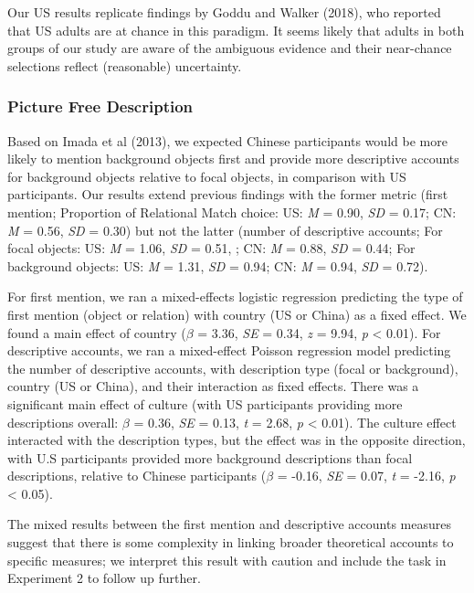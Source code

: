 \documentclass[
  man,floatsintext]{apa6}
\begin{document}
Our US results replicate findings by Goddu and Walker (2018), who reported that US adults are at chance in this paradigm. It seems likely that adults in both groups of our study are aware of the ambiguous evidence and their near-chance selections reflect (reasonable) uncertainty.

\hypertarget{picture-free-description}{%
\subsubsection{Picture Free Description}\label{picture-free-description}}

Based on Imada et al (2013), we expected Chinese participants would be more likely to mention background objects first and provide more descriptive accounts for background objects relative to focal objects, in comparison with US participants. Our results extend previous findings with the former metric (first mention; Proportion of Relational Match choice: US: \emph{M} = 0.90, \emph{SD} = 0.17; CN: \emph{M} = 0.56, \emph{SD} = 0.30) but not the latter (number of descriptive accounts; For focal objects: US: \emph{M} = 1.06, \emph{SD} = 0.51, ; CN: \emph{M} = 0.88, \emph{SD} = 0.44; For background objects: US: \emph{M} = 1.31, \emph{SD} = 0.94; CN: \emph{M} = 0.94, \emph{SD} = 0.72).

For first mention, we ran a mixed-effects logistic regression predicting the type of first mention (object or relation) with country (US or China) as a fixed effect. We found a main effect of country (\(\beta\) = 3.36, \emph{SE} = 0.34, \emph{z} = 9.94, \emph{p} \textless{} 0.01). For descriptive accounts, we ran a mixed-effect Poisson regression model predicting the number of descriptive accounts, with description type (focal or background), country (US or China), and their interaction as fixed effects. There was a significant main effect of culture (with US participants providing more descriptions overall: \(\beta\) = 0.36, \emph{SE} = 0.13, \emph{t} = 2.68, \emph{p} \textless{} 0.01). The culture effect interacted with the description types, but the effect was in the opposite direction, with U.S participants provided more background descriptions than focal descriptions, relative to Chinese participants (\(\beta\) = -0.16, \emph{SE} = 0.07, \emph{t} = -2.16, \emph{p} \textless{} 0.05).

The mixed results between the first mention and descriptive accounts measures suggest that there is some complexity in linking broader theoretical accounts to specific measures; we interpret this result with caution and include the task in Experiment 2 to follow up further.
\end{document}

